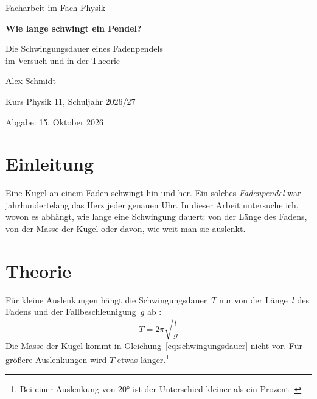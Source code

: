 \documentclass[12pt,a4paper]{article}
\begin{document}
\begin{titlepage}
  \centering
  \vspace*{30mm}
  {\Large Facharbeit im Fach Physik\par}
  \vspace{15mm}
  {\huge\bfseries Wie lange schwingt ein Pendel?\par}
  \vspace{6mm}
  {\Large Die Schwingungsdauer eines Fadenpendels\\ im Versuch und in der Theorie\par}
  \vfill
  {\large Alex Schmidt\par}
  \vspace{3mm}
  {\large Kurs Physik 11, Schuljahr 2026/27\par}
  \vspace{3mm}
  {\large Abgabe: 15. Oktober 2026\par}
\end{titlepage}

\tableofcontents
\newpage

\section{Einleitung}

Eine Kugel an einem Faden schwingt hin und her. Ein solches \emph{Fadenpendel}
war jahrhundertelang das Herz jeder genauen Uhr. In dieser Arbeit untersuche
ich, wovon es abhängt, wie lange eine Schwingung dauert: von der Länge des
Fadens, von der Masse der Kugel oder davon, wie weit man sie auslenkt.

\section{Theorie}

Für kleine Auslenkungen hängt die Schwingungsdauer~$T$ nur von der Länge~$l$
des Fadens und der Fallbeschleunigung~$g$ ab \parencite{tipler2019}:
\begin{equation}
  T = 2\pi \sqrt{\frac{l}{g}}
  \label{eq:schwingungsdauer}
\end{equation}
Die Masse der Kugel kommt in Gleichung~\eqref{eq:schwingungsdauer} nicht vor.
Für größere Auslenkungen wird $T$ etwas länger.\footnote{Bei einer Auslenkung
von \ang{20} ist der Unterschied kleiner als ein Prozent \parencite{pendel}.}
\end{document}
